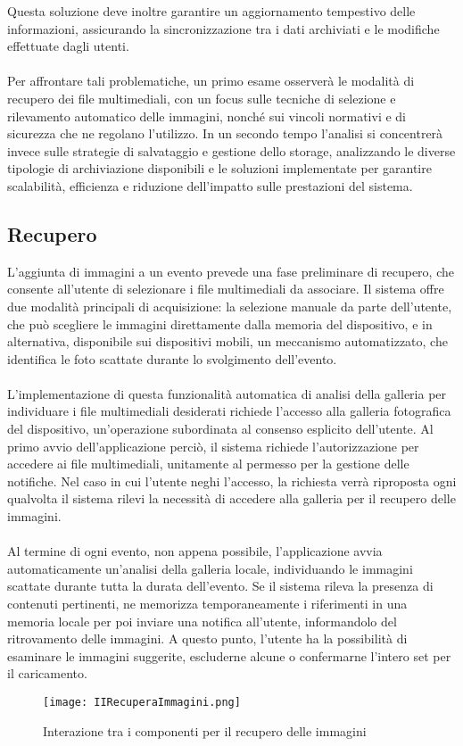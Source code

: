 Questa soluzione deve inoltre garantire un aggiornamento tempestivo delle informazioni, assicurando la sincronizzazione tra i dati archiviati e le modifiche effettuate dagli utenti.\\
\\
Per affrontare tali problematiche, un primo esame osserverà le modalità di recupero dei file multimediali,
con un focus sulle tecniche di selezione e rilevamento automatico delle immagini, nonché sui vincoli normativi e di sicurezza che ne regolano l’utilizzo.
In un secondo tempo l’analisi si concentrerà invece sulle strategie di salvataggio e gestione dello storage,
analizzando le diverse tipologie di archiviazione disponibili e le soluzioni implementate per garantire scalabilità, efficienza e riduzione dell’impatto sulle prestazioni del sistema.


\clearpage


\subsection{ Recupero}

L’aggiunta di immagini a un evento prevede una fase preliminare di recupero, che consente all’utente di selezionare i file multimediali da associare. 
Il sistema offre due modalità principali di acquisizione: la selezione manuale da parte dell’utente, che può scegliere le immagini direttamente dalla memoria del dispositivo, 
e in alternativa, disponibile sui dispositivi mobili, un meccanismo automatizzato, che identifica le foto scattate durante lo svolgimento dell’evento.\\
\\
L’implementazione di questa funzionalità automatica di analisi della galleria per individuare i file multimediali desiderati  richiede l’accesso alla galleria fotografica del dispositivo, 
un’operazione subordinata al consenso esplicito dell’utente. 
Al primo avvio dell’applicazione perciò, il sistema richiede l’autorizzazione per accedere ai file multimediali, unitamente al permesso per la gestione delle notifiche. 
Nel caso in cui l’utente neghi l’accesso, la richiesta verrà riproposta ogni qualvolta il sistema rilevi la necessità di accedere alla galleria per il recupero delle immagini.\\
\\
Al termine di ogni evento, non appena possibile, l’applicazione avvia automaticamente un’analisi della galleria locale, individuando le immagini scattate durante tutta la durata dell’evento. 
Se il sistema rileva la presenza di contenuti pertinenti, ne memorizza temporaneamente i riferimenti in una memoria locale per poi inviare una notifica all’utente, 
informandolo del ritrovamento delle immagini. A questo punto, l’utente ha la possibilità di esaminare le immagini suggerite, escluderne alcune o confermarne l’intero set per il caricamento.\\
\clearpage
\begin{figure}[htb]
    \centering
    \texttt{[image: IIRecuperaImmagini.png]}
    \caption{Interazione tra i componenti per il recupero delle immagini}
\end{figure}

